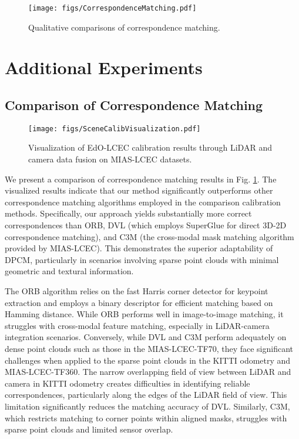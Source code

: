 \begin{figure}
    
    \centering
    
    \texttt{[image: figs/CorrespondenceMatching.pdf]}
    \caption{Qualitative comparisons of correspondence matching.}
    \label{fig.cmp_matching}
    \vspace{-2em}
\end{figure}



\section{Additional Experiments}
\subsection{Comparison of Correspondence Matching}
\begin{figure*}[t!]
    \centering
    \texttt{[image: figs/SceneCalibVisualization.pdf]}
    \caption{Visualization of EdO-LCEC calibration results through LiDAR and camera data fusion on MIAS-LCEC datasets.}
    \label{fig.EdO_calib_visualization}
    \vspace{-0.8em}
\end{figure*}

We present a comparison of correspondence matching results in Fig. \ref{fig.cmp_matching}. The visualized results indicate that our method significantly outperforms other correspondence matching algorithms employed in the comparison calibration methods. Specifically, our approach yields substantially more correct correspondences than ORB, DVL (which employs SuperGlue for direct 3D-2D correspondence matching), and C3M (the cross-modal mask matching algorithm provided by MIAS-LCEC). This demonstrates the superior adaptability of DPCM, particularly in scenarios involving sparse point clouds with minimal geometric and textural information. 

The ORB algorithm relies on the fast Harris corner detector for keypoint extraction and employs a binary descriptor for efficient matching based on Hamming distance. While ORB performs well in image-to-image matching, it struggles with cross-modal feature matching, especially in LiDAR-camera integration scenarios. Conversely, while DVL and C3M perform adequately on dense point clouds such as those in the MIAS-LCEC-TF70, they face significant challenges when applied to the sparse point clouds in the KITTI odometry and MIAS-LCEC-TF360. The narrow overlapping field of view between LiDAR and camera in KITTI odometry creates difficulties in identifying reliable correspondences, particularly along the edges of the LiDAR field of view. This limitation significantly reduces the matching accuracy of DVL. Similarly, C3M, which restricts matching to corner points within aligned masks, struggles with sparse point clouds and limited sensor overlap.

